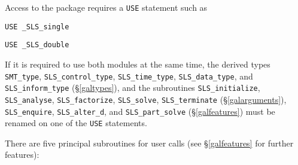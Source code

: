 \documentclass{galahad}
\newcommand{\packagename}{SLS}
\newcommand{\fullpackagename}{\libraryname\_\-\packagename}
\begin{document}
Access to the package requires a {\tt USE} statement such as

\medskip{}

\hskip0.5in {\tt USE \fullpackagename\_single}

\medskip{}

\hskip0.5in {\tt USE  \fullpackagename\_double}

\medskip

If it is required to use both modules at the same time, the derived types
{\tt SMT\_type},
{\tt \packagename\_control\_type},
{\tt \packagename\_time\-\_type},
{\tt \packagename\_data\-\_type}, and
{\tt \packagename\_inform\_type}
(\S\ref{galtypes}),
and the subroutines
{\tt \packagename\_initialize},
{\tt \packagename\_analyse},
{\tt \packagename\-\_factorize},
{\tt \packagename\_solve},
{\tt \packagename\_terminate}
(\S\ref{galarguments}),
{\tt \packagename\_enquire},
{\tt \packagename\_alter\_d}, and
{\tt \packagename\_part\_solve}
(\S\ref{galfeatures})
must be renamed on one of the {\tt USE} statements.

\noindent There are five principal subroutines for user calls (see
\S\ref{galfeatures} for further features):
\end{document}
